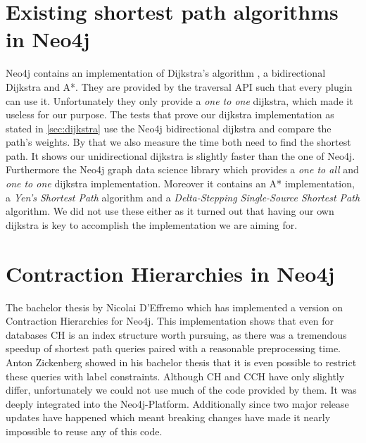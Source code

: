 \section{Existing shortest path algorithms in Neo4j}\label{sec:neo4j_existing_algs}

Neo4j contains an implementation of Dijkstra's algorithm , a bidirectional Dijkstra and A*.
They are provided by the traversal API such that every plugin can use it.
Unfortunately they only provide a \textit{one to one} dijkstra, which made it useless for our purpose.
The tests that prove our dijkstra implementation as stated in \ref{sec:dijkstra} use the Neo4j bidirectional dijkstra and compare the path's weights.
By that we also measure the time both need to find the shortest path.
It shows our unidirectional dijkstra is slightly faster than the one of Neo4j.
\\
Furthermore the Neo4j graph data science library  which provides a \textit{one to all} and \textit{one to one} dijkstra implementation.
Moreover it contains an A* implementation, a \textit{Yen’s Shortest Path} algorithm and a \textit{Delta-Stepping Single-Source Shortest Path} algorithm.
We did not use these either as it turned out that having our own dijkstra is key to accomplish the implementation we are aiming for.

\section{Contraction Hierarchies in Neo4j}\label{sec:related_work:database}

The bachelor thesis by Nicolai D'Effremo \cite{DEffremo2019} which has implemented a version on Contraction Hierarchies \cite{Geisberger_2012} for Neo4j.
This implementation shows that even for databases CH is an index structure worth pursuing, as there was a tremendous speedup of shortest path queries paired with a reasonable preprocessing time.
Anton Zickenberg \cite{Zickenberg2021} showed in his bachelor thesis that it is even possible to restrict these queries with label constraints.
Although CH and CCH have only slightly differ, unfortunately we could not use much of the code provided by them.
It was deeply integrated into the Neo4j-Platform.
Additionally since two major release updates have happened which meant breaking changes have made it nearly impossible to reuse any of this code.
